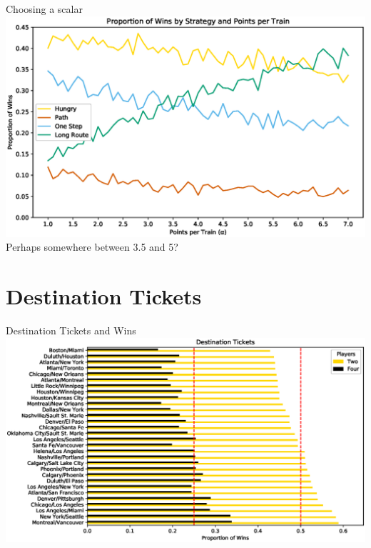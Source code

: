 \documentclass[12pt]{beamer}
\begin{document}
\begin{frame}{Choosing a scalar}
    \centering
    \includegraphics[scale=.45]{figures/points}   
    Perhaps somewhere between 3.5 and 5?
\end{frame}

\section{Destination Tickets}

\begin{frame}{Destination Tickets and Wins}
    \centering
    \includegraphics[scale=.45]{figures/destination_tickets}
\end{frame}
\end{document}
